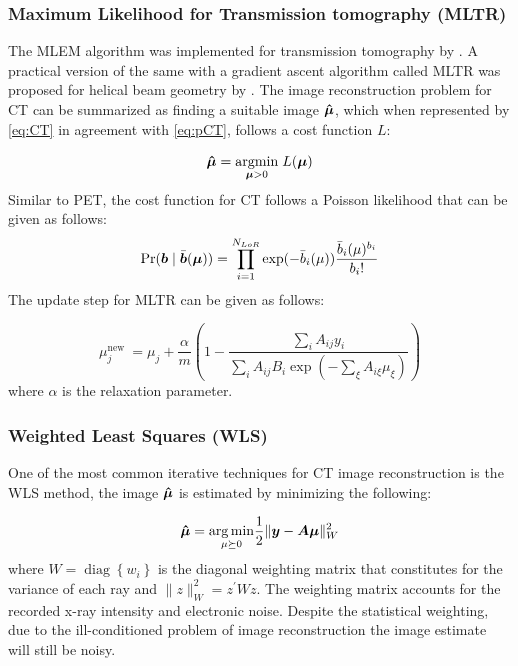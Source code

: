 \subsubsection{Maximum Likelihood for Transmission tomography (MLTR)}

The \ac{MLEM} algorithm was implemented for transmission tomography by \cite{lange1984reconstruction}. A practical version of the same with a gradient ascent algorithm called \ac{MLTR} was proposed for helical beam geometry  by \cite{nuyts1998iterative}. The image reconstruction problem for \ac{CT} can be summarized as finding a suitable image $\bm{\hat{\mu}}$, which when represented by \ref{eq:CT} in agreement with \ref{eq:pCT}, follows a cost function $L$:

\begin{equation}\label{eq:argminCT}
\bm{\hat{\mu}}=\underset{\bm{\mu} > 0}{\operatorname{argmin}} \; L(\bm{\mu})
\end{equation}
Similar to \ac{PET}, the cost function for \ac{CT} follows a Poisson likelihood that can be given as follows: 
\begin{equation}\label{eq:poisson_CT}
\operatorname{Pr}(\bm{b} \mid \bar{\bm{b}}(\bm{\mu}))=\prod_{i=1}^{N_{L o R}} \exp (-\bar{b}_{i}(\mu)) \frac{\bar{b}_{i}(\mu)^{b_{i}}}{b_{i} !} 
\end{equation}  
The update step for \ac{MLTR} can be given as follows:

\begin{equation}\label{eq:MLTR}
\mu_{j}^{\text {new }}=\mu_{j}+\frac{\alpha}{m}\left(1-\frac{\sum_{i} A_{i j} y_{i}}{\sum_{i} A_{i j} B_{i} \exp \left(-\sum_{\xi} A_{i \xi} \mu_{\xi}\right)}\right)
\end{equation}
where $\alpha$ is the relaxation parameter. 

\subsubsection{Weighted Least Squares (WLS)}

One of the most common iterative techniques for \ac{CT} image reconstruction is the \ac{WLS} method, the image $\bm{\hat{\mu}}$ is estimated by minimizing the following:

\begin{equation}
\bm{\hat{\mu}}=\underset{\mu \succeq 0}{\arg \min } \frac{1}{2}\|\bm{y}-\bm{A} \bm{\mu}\|_{W}^{2}
\end{equation}
where $W=\operatorname{diag}\left\{w_{i}\right\}$ is the diagonal weighting matrix that constitutes for the variance of each ray and $\|z\|_{W}^{2}=z^{\prime} W z$. The weighting matrix accounts for the recorded x-ray intensity and electronic noise. Despite the statistical weighting, due to the ill-conditioned problem of image reconstruction the image estimate will still be noisy. 

